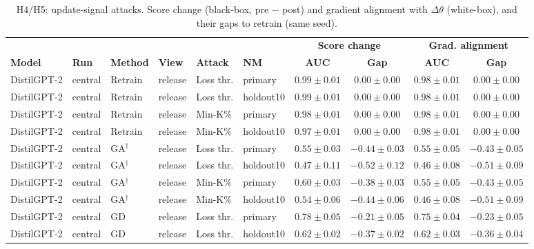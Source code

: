 \begin{table}[t]
\centering
\caption{H4/H5: update-signal attacks. Score change (black-box, pre $-$ post) and gradient alignment with $\Delta\theta$ (white-box), and their gaps to retrain (same seed).}
\label{tab:update}
\footnotesize
\renewcommand{\arraystretch}{1.2}
\setlength{\tabcolsep}{3pt}
\begin{tabular*}{\textwidth}{@{\extracolsep{\fill}}llllllcccc@{}}
\toprule
 & & & & & & \multicolumn{2}{c}{\textbf{Score change}} & \multicolumn{2}{c}{\textbf{Grad. alignment}} \\
\cmidrule(lr){7-8}\cmidrule(lr){9-10}
\textbf{Model} & \textbf{Run} & \textbf{Method} & \textbf{View} & \textbf{Attack} & \textbf{NM} & \textbf{AUC} & \textbf{Gap} & \textbf{AUC} & \textbf{Gap} \\
\midrule
DistilGPT-2 & central & Retrain & release & Loss thr. & primary & $0.99 \pm 0.01$ & $0.00 \pm 0.00$ & $0.98 \pm 0.01$ & $0.00 \pm 0.00$ \\
DistilGPT-2 & central & Retrain & release & Loss thr. & holdout10 & $0.99 \pm 0.01$ & $0.00 \pm 0.00$ & $0.98 \pm 0.01$ & $0.00 \pm 0.00$ \\
DistilGPT-2 & central & Retrain & release & Min-K\% & primary & $0.98 \pm 0.01$ & $0.00 \pm 0.00$ & $0.98 \pm 0.01$ & $0.00 \pm 0.00$ \\
DistilGPT-2 & central & Retrain & release & Min-K\% & holdout10 & $0.97 \pm 0.01$ & $0.00 \pm 0.00$ & $0.98 \pm 0.01$ & $0.00 \pm 0.00$ \\
DistilGPT-2 & central & GA$^{\dagger}$ & release & Loss thr. & primary & $0.55 \pm 0.03$ & $-0.44 \pm 0.03$ & $0.55 \pm 0.05$ & $-0.43 \pm 0.05$ \\
DistilGPT-2 & central & GA$^{\dagger}$ & release & Loss thr. & holdout10 & $0.47 \pm 0.11$ & $-0.52 \pm 0.12$ & $0.46 \pm 0.08$ & $-0.51 \pm 0.09$ \\
DistilGPT-2 & central & GA$^{\dagger}$ & release & Min-K\% & primary & $0.60 \pm 0.03$ & $-0.38 \pm 0.03$ & $0.55 \pm 0.05$ & $-0.43 \pm 0.05$ \\
DistilGPT-2 & central & GA$^{\dagger}$ & release & Min-K\% & holdout10 & $0.54 \pm 0.06$ & $-0.44 \pm 0.06$ & $0.46 \pm 0.08$ & $-0.51 \pm 0.09$ \\
DistilGPT-2 & central & GD & release & Loss thr. & primary & $0.78 \pm 0.05$ & $-0.21 \pm 0.05$ & $0.75 \pm 0.04$ & $-0.23 \pm 0.05$ \\
DistilGPT-2 & central & GD & release & Loss thr. & holdout10 & $0.62 \pm 0.02$ & $-0.37 \pm 0.02$ & $0.62 \pm 0.03$ & $-0.36 \pm 0.04$ \\

\end{tabular*}
\end{table}
